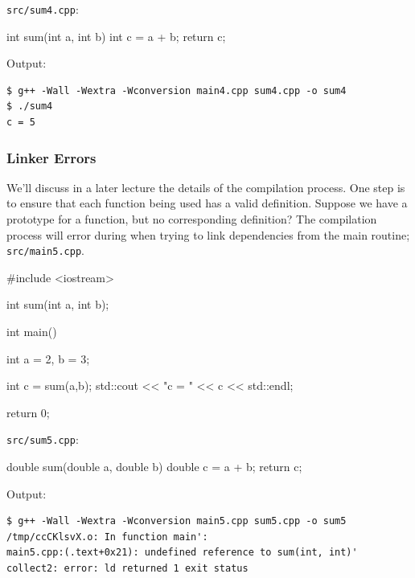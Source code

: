 \documentclass[12pt,letterpaper,twoside]{article}
\begin{document}
\texttt{src/sum4.cpp}:

\begin{cpp}
int sum(int a, int b) {
  int c = a + b;
  return c;
}
\end{cpp}

Output:

\begin{verbatim}
$ g++ -Wall -Wextra -Wconversion main4.cpp sum4.cpp -o sum4
$ ./sum4
c = 5
\end{verbatim}

\subsubsection{Linker Errors} We'll discuss in a later lecture the details of the 
compilation process. One step is to ensure that each function being used has a valid 
definition. Suppose we have a prototype for a function, but no corresponding definition?
The compilation process will error during when trying to link dependencies from the main
routine; \texttt{src/main5.cpp}.

\begin{cpp}
#include <iostream>

int sum(int a, int b);

int main() {
  int a = 2, b = 3;

  int c = sum(a,b);
  std::cout << "c = " << c << std::endl;

  return 0;
}
\end{cpp}

\texttt{src/sum5.cpp}:

\begin{cpp}
double sum(double a, double b) {
  double c = a + b;
  return c;
}
\end{cpp}

Output:

\begin{verbatim}
$ g++ -Wall -Wextra -Wconversion main5.cpp sum5.cpp -o sum5
/tmp/ccCKlsvX.o: In function main':
main5.cpp:(.text+0x21): undefined reference to sum(int, int)'
collect2: error: ld returned 1 exit status
\end{verbatim}
\end{document}
